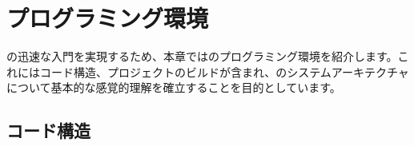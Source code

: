 \begin{savequote}[45mm]
\end{savequote}

\chapter{プログラミング環境} 
\label{ch:prog-env}

\begin{content}

\tf{}の迅速な入門を実現するため、本章では\tf{}のプログラミング環境を紹介します。これにはコード構造、プロジェクトのビルドが含まれ、\tf{}のシステムアーキテクチャについて基本的な感覚的理解を確立することを目的としています。

\end{content}

\section{コード構造}

